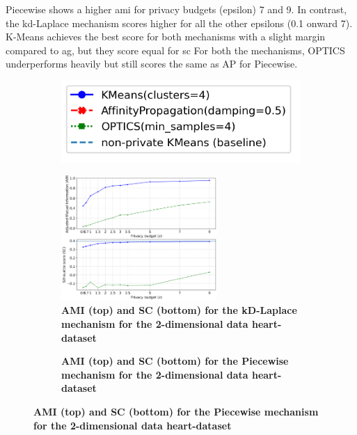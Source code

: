 Piecewise shows a higher \gls{ami} for privacy budgets (epsilon) 7 and 9. In contrast, the kd-Laplace mechanism scores higher for all the other epsilons (0.1 onward 7).
K-Means achieves the best score for both mechanisms with a slight margin compared to \gls{ag}, but they score equal for \gls{sc}
For both the mechanisms, OPTICS underperforms heavily but still scores the same as AP for Piecewise.
\newpage
\begin{figure}[H]
    \centering
    \begin{subfigure}{0.3\textwidth}
        \includegraphics[width=\textwidth]{Results/2d-laplace/heart-dataset/legend.png}
    \end{subfigure}
    \begin{subfigure}{1\textwidth}
        \caption{\textbf{AMI (top) and SC (bottom) for the kD-Laplace mechanism for the 2-dimensional data heart-dataset}}
        \centering
        \includegraphics[width=0.65\textwidth]{Results/kd-laplace/kd-Laplace/heart-dataset/ami-and-sc_2_dimensions.png}
        \centering
    \end{subfigure}
    \begin{subfigure}{1\textwidth}
        \caption{\textbf{AMI (top) and SC (bottom) for the Piecewise mechanism for the 2-dimensional data heart-dataset}}
        \centering

\end{subfigure}
\end{figure}
